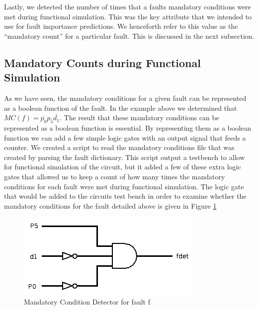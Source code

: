     Lastly, we detected the number of times that a faults mandatory conditions were met during functional simulation.
    This was the key attribute that we intended to use for fault importance predictions. 
    We henceforth refer to this value as the ``mandatory count'' for a particular fault.
    This is discussed in the next subsection.
    

    \subsection{Mandatory Counts during Functional Simulation}
    As we have seen, the mandatory conditions for a given fault can be represented as a boolean function of the fault. 
    In the example above we determined that $MC(f) = \overline{p_{0}}p_{5}\overline{d_{1}}$. 
    The result that these mandatory conditions can be represented as a boolean function is essential. 
    By representing them as a boolean function we can add a few simple logic gates with an output signal that feeds a counter. 
    We created a script to read the mandatory conditions file that was created by parsing the fault dictionary. 
    This script output a testbench to allow for functional simulation of the circuit, but it added a few of these extra logic gates that allowed us to keep a count of how many times the mandatory conditions for each fault were met during functional simulation. 
    The logic gate that would be added to the circuits test bench in order to examine whether the mandatory conditions for the fault detailed above is given in Figure \ref{fig:mandgate}

\begin{figure}[h!]
\centering
\caption{Mandatory Condition Detector for fault f\label{fig:mandgate}}
\includegraphics[scale=0.5]{Figures/mand.png}
\end{figure} 

